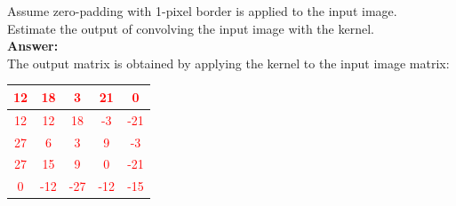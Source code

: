 \documentclass{book}
\begin{document}
\begin{center}
\end{center}
Assume zero-padding with 1-pixel border is applied to the input image.\\
Estimate the output of convolving the input image with the kernel.\\
\vspace{2mm}
\textbf{Answer:}\\
The output matrix is obtained by applying the kernel to the input image matrix:
\begin{center}
    \textcolor{red}{
    \begin{tabular}{|c|c|c|c|c|}
        \hline
        12 & 18 & 3 & 21 & 0 \\
        \hline
        12 & 12 & 18 & -3 & -21 \\
        \hline
        27 & 6 & 3 & 9 & -3 \\
        \hline
        27 & 15 & 9 & 0 & -21 \\
        \hline
        0 & -12 & -27 & -12 & -15 \\
        \hline
    \end{tabular}
    }
\end{center}
\end{document}
